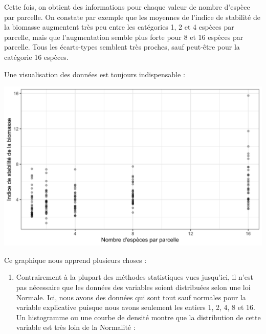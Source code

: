 \documentclass[a4paperpaper,]{article}
\newenvironment{Shaded}{\begin{snugshade}}{\end{snugshade}}
\newcommand{\DataTypeTok}[1]{\textcolor[rgb]{0.00,0.34,0.68}{#1}}
\newcommand{\FloatTok}[1]{\textcolor[rgb]{0.69,0.50,0.00}{#1}}
\newcommand{\KeywordTok}[1]{\textcolor[rgb]{0.12,0.11,0.11}{\textbf{#1}}}
\newcommand{\NormalTok}[1]{\textcolor[rgb]{0.12,0.11,0.11}{#1}}
\newcommand{\OperatorTok}[1]{\textcolor[rgb]{0.12,0.11,0.11}{#1}}
\newcommand{\StringTok}[1]{\textcolor[rgb]{0.75,0.01,0.01}{#1}}
\providecommand{\tightlist}{%
  \setlength{\itemsep}{0pt}\setlength{\parskip}{0pt}}
\begin{document}
Cette fois, on obtient des informations pour chaque valeur de nombre d'espèce par parcelle. On constate par exemple que les moyennes de l'indice de stabilité de la biomasse augmentent très peu entre les catégories 1, 2 et 4 espèces par parcelle, mais que l'augmentation semble plus forte pour 8 et 16 espèces par parcelle. Tous les écarts-types semblent très proches, sauf peut-être pour la catégorie 16 espèces.

Une visualisation des données est toujours indispensable :

\begin{Shaded}
\end{Shaded}

\begin{center}\includegraphics[width=0.9\linewidth]{figure/unnamed-chunk-113-1} \end{center}

Ce graphique nous apprend plusieurs choses :

\begin{enumerate}
\def\labelenumi{\arabic{enumi}.}
\tightlist
\item
  Contrairement à la plupart des méthodes statistiques vues jusqu'ici, il n'est pas nécessaire que les données des variables soient distribuées selon une loi Normale. Ici, nous avons des données qui sont tout sauf normales pour la variable explicative puisque nous avons seulement les entiers 1, 2, 4, 8 et 16. Un histogramme ou une courbe de densité montre que la distribution de cette variable est très loin de la Normalité :
\end{enumerate}
\end{document}
